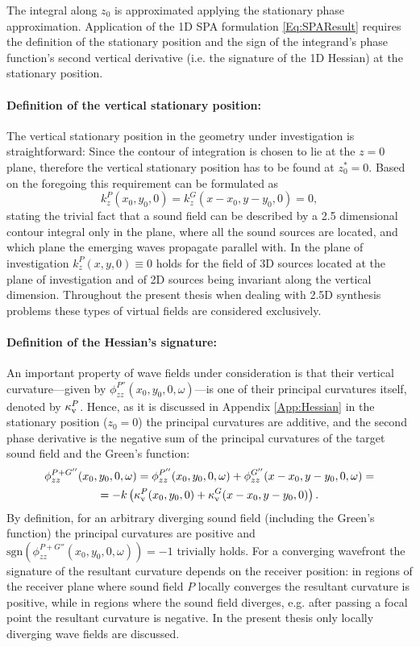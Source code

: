 The integral along $z_0$ is approximated applying the stationary phase approximation.
Application of the 1D SPA formulation \eqref{Eq:SPAResult} requires the definition of the stationary position and the sign of the integrand's phase function's second vertical derivative (i.e. the signature of the 1D Hessian) at the stationary position.

\paragraph{Definition of the vertical stationary position:}
The vertical stationary position in the geometry under investigation is straightforward:
Since the contour of integration is chosen to lie at the $z=0$ plane, therefore the vertical stationary position has to be found at $z_0^* = 0$.
Based on the foregoing this requirement can be formulated as
\begin{equation}
k_z^P(x_0,y_0,0) = k_z^G(x-x_0,y-y_0,0) = 0,
\end{equation}
stating the trivial fact that a sound field can be described by a 2.5 dimensional contour integral only in the plane, where all the sound sources are located, and which plane the emerging waves propagate parallel with.
In the plane of investigation $k_z^P(x,y,0) \equiv 0$ holds for the field of 3D sources located at the plane of investigation and of 2D sources being invariant along the vertical dimension.
Throughout the present thesis when dealing with 2.5D synthesis problems these types of virtual fields are considered exclusively.

\paragraph{Definition of the Hessian's signature:}
An important property of wave fields under consideration is that their vertical curvature---given by $\phi^{P''}_{zz}(x_0,y_0,0,\omega)$---is one of their principal curvatures itself, denoted by $\kappa_\mathrm{v}^P$.
Hence, as it is discussed in Appendix \ref{App:Hessian} in the stationary position ($z_0 = 0$) the principal curvatures are additive, and the second phase derivative is the negative sum of the principal curvatures of the target sound field and the Green's function:
\begin{multline}
\phi^{P + G''}_{zz}(x_0,y_0,0,\omega) = \phi^{P''}_{zz}(x_0,y_0,0,\omega) +\phi^{G''}_{zz}(x-x_0,y-y_0,0,\omega) = \\ = -k\left( \kappa_\mathrm{v}^P(x_0,y_0,0) + \kappa_\mathrm{v}^G(x-x_0,y-y_0,0) \right).
\label{Eq:SFS_theory:Curvatures_Addition}
\end{multline}
By definition, for an arbitrary diverging sound field (including the Green's function) the principal curvatures are positive and $\mathrm{sgn} \left( \phi^{P + G''}_{zz}(x_0,y_0,0,\omega) \right) = -1$ trivially holds.
For a converging wavefront the signature of the resultant curvature depends on the receiver position: in regions of the receiver plane where sound field $P$ locally converges the resultant curvature is positive, while in regions where the sound field diverges, e.g. after passing a focal point the resultant curvature is negative.
In the present thesis only locally diverging wave fields are discussed.

